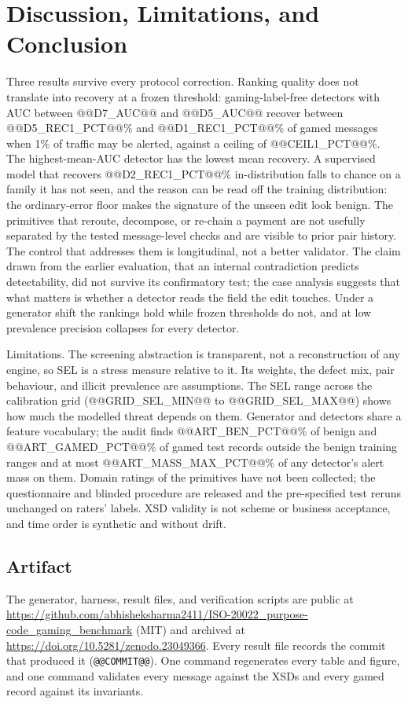 \documentclass[conference]{IEEEtran}
\newif\ifanonymous
\begin{document}
\section{Discussion, Limitations, and Conclusion}
Three results survive every protocol correction. Ranking quality does not
translate into recovery at a frozen threshold: gaming-label-free detectors with AUC
between @@D7_AUC@@ and @@D5_AUC@@ recover between @@D5_REC1_PCT@@\% and
@@D1_REC1_PCT@@\% of gamed messages when 1\% of traffic may be alerted,
against a ceiling of @@CEIL1_PCT@@\%. The highest-mean-AUC detector has the lowest mean recovery. A supervised model that recovers @@D2_REC1_PCT@@\% in-distribution
falls to chance on a family it has not seen, and the reason can be read off
the training distribution: the ordinary-error floor makes the signature of
the unseen edit look benign. The primitives that reroute, decompose, or
re-chain a payment are not usefully separated by the tested message-level
checks and are visible to prior pair history. The control that addresses them is longitudinal, not a better
validator. The claim drawn from the earlier
evaluation, that an internal contradiction predicts detectability, did not
survive its confirmatory test; the case analysis suggests that what matters
is whether a detector reads the field the edit touches. Under a generator shift the
rankings hold while frozen thresholds do not, and at low prevalence
precision collapses for every detector.

Limitations. The screening abstraction is transparent, not a reconstruction
of any engine, so SEL is a stress measure relative to it. Its weights, the
defect mix, pair behaviour, and illicit prevalence are assumptions. The SEL
range across the calibration grid (@@GRID_SEL_MIN@@ to @@GRID_SEL_MAX@@)
shows how much the modelled threat depends on them. Generator and detectors
share a feature vocabulary; the audit finds @@ART_BEN_PCT@@\% of benign and
@@ART_GAMED_PCT@@\% of gamed test records outside the benign training ranges
and at most @@ART_MASS_MAX_PCT@@\% of any detector's alert mass on them.
Domain ratings of the primitives have not been collected; the questionnaire
and blinded procedure are released and the pre-specified test reruns
unchanged on raters' labels. XSD validity is not scheme or business
acceptance, and time order is synthetic and without drift.

\subsection*{Artifact}
\ifanonymous
The generator, harness, result files, and verification scripts accompany
the submission and will be public on acceptance; every result file records
the commit that produced it (\texttt{@@COMMIT@@}).
\else
The generator, harness, result files, and verification scripts are public at
\url{https://github.com/abhisheksharma2411/ISO-20022_purpose-code_gaming_benchmark}
(MIT) and archived at \url{https://doi.org/10.5281/zenodo.23049366}. Every
result file records the commit that produced it (\texttt{@@COMMIT@@}). One
command regenerates every table and figure, and one command validates every
message against the XSDs and every gamed record against its invariants.
\fi
\end{document}
